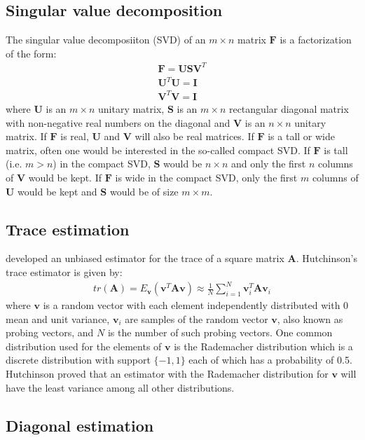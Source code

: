 \subsection{Singular value decomposition}

The singular value decomposiiton (SVD) of an $m \times n$ matrix $\bm{F}$ is a factorization of the form:
\begin{align}
    \bm{F} = \bm{U} \bm{S} \bm{V}^T \\
    \bm{U}^T \bm{U} = \bm{I} \\
    \bm{V}^T \bm{V} = \bm{I}
\end{align}
where $\bm{U}$ is an $m \times n$ unitary matrix, $\bm{S}$ is an $m \times n$ rectangular diagonal matrix with non-negative real numbers on the diagonal and $\bm{V}$ is an $n \times n$ unitary matrix. If $\bm{F}$ is real, $\bm{U}$ and $\bm{V}$ will also be real matrices. If $\bm{F}$ is a tall or wide matrix, often one would be interested in the so-called compact SVD. If $\bm{F}$ is tall (i.e. $m > n$) in the compact SVD, $\bm{S}$ would be $n \times n$ and only the first $n$ columns of $\bm{V}$ would be kept. If $\bm{F}$ is wide in the compact SVD, only the first $m$ columns of $\bm{U}$ would be kept and $\bm{S}$ would be of size $m \times m$.

\subsection{Trace estimation}

\cite{Hutchinson1990} developed an unbiased estimator for the trace of a square matrix $\bm{A}$. Hutchinson's trace estimator is given by:
\begin{align}
  tr(\bm{A}) = E_{\bm{v}}(\bm{v}^T \bm{A} \bm{v}) \approx \frac{1}{N} \sum_{i=1}^{N} \bm{v}_i^T \bm{A} \bm{v}_i
\end{align}
where $\bm{v}$ is a random vector with each element independently distributed with 0 mean and unit variance, $\bm{v}_i$ are samples of the random vector $\bm{v}$, also known as probing vectors, and $N$ is the number of such probing vectors. One common distribution used for the elements of $\bm{v}$ is the Rademacher distribution which is a discrete distribution with support $\{-1, 1\}$ each of which has a probability of 0.5. Hutchinson proved that an estimator with the Rademacher distribution for $\bm{v}$ will have the least variance among all other distributions.

\subsection{Diagonal estimation}

